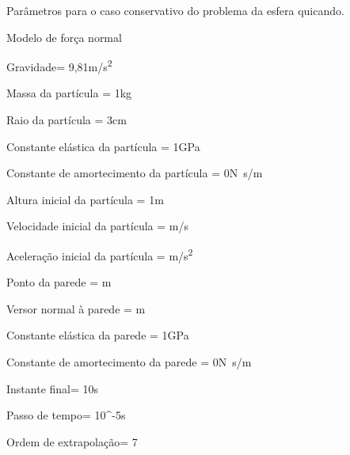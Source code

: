 \begin{table}[h]
\centering
\caption{Parâmetros para o caso conservativo do problema da esfera quicando.}
\label{tab:bouncing_sphere:conservative:parameters}
\begin{parametersdesc}{0.9\textwidth}
	\item{Modelo de força normal}{}{\emptyUnit}
	\item{Gravidade}{\gravityScalar = 9,81}{\si[per-mode=symbol]{\metre\per\square\second}}
	\hline
	\item{Massa da partícula}{\ind{\mass}{\particle} = 1}{\si\kilogram}
	\item{Raio da partícula}{\ind{\radius}{\particle} = 3}{\si\centi\metre}
	\item{Constante elástica da partícula}{\ind{\elasticModulus}{\particle} = 1}{\si[per-mode=symbol]{\giga\pascal}}
	\item{Constante de amortecimento da partícula}{\ind{\normalDampingConstant}{\particle} = \SI{0}{}}{\si[per-mode=symbol]{\newton\second\per\meter}}
	\hline
	\item{Altura inicial da partícula}{\initial{\positiony} = 1}{\si{\metre}}
	\item{Velocidade inicial da partícula}{\explicitVector{\initial{\velocityx}}{\initial{\velocityy}}{\initial{\velocityz}} = }{\si[per-mode=symbol]{\metre\per\second}}
	\item{Aceleração inicial da partícula}{\explicitVector{\initial{\accelerationx}}{\initial{\accelerationy}}{\initial{\accelerationz}} = }{\si[per-mode=symbol]{\metre\per\square\second}}
	\hline
	\item{Ponto da parede}{\ind{\planeOrigin}{\element} = }{\si\meter}
	\item{Versor normal à parede}{\ind{\planeNormalVersor}{\element} = }{\si\metre}
	\item{Constante elástica da parede}{\ind{\elasticModulus}{\element} = 1}{\si[per-mode=symbol]{\giga\pascal}}
	\item{Constante de amortecimento da parede}{\ind{\normalDampingConstant}{\element} = \SI{0}{}}{\si[per-mode=symbol]{\newton\second\per\meter}}
	\hline
	\item{Instante final}{\finalInstant = 10}{\si\second} 
	\item{Passo de tempo}{\Dt = 10^{-5}}{\si\second}
	\item{Ordem de extrapolação}{\taylorOrder = 7}{\emptyUnit}
\end{parametersdesc}
\sourceMe 
\end{table}

